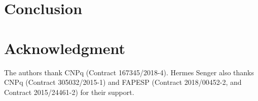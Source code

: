 \documentclass[conference]{IEEEtran}
\begin{document}
\section{Conclusion}\label{sec:conclusion}

\section*{Acknowledgment}

The authors thank CNPq (Contract 167345/2018-4).
Hermes Senger also thanks CNPq (Contract 305032/2015-1) and FAPESP (Contract
2018/00452-2, and Contract 2015/24461-2) for their support.

% 


\end{document}
